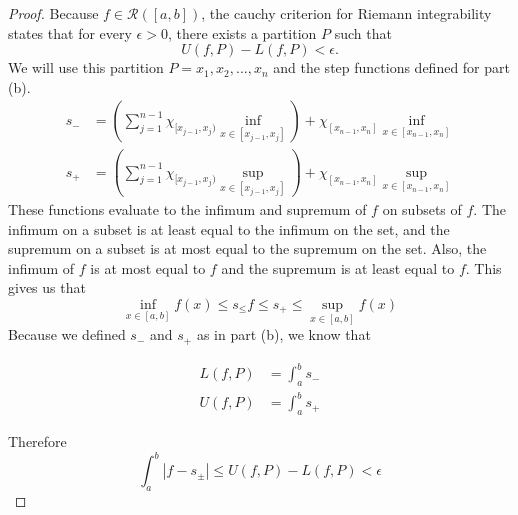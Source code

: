 \documentclass[12pt]{article}
\begin{document}
\begin{itemize}
    \begin{proof}
        Because $f \in \mathcal{R}([a,b])$, the cauchy criterion for Riemann integrability states that for every $\epsilon > 0$, there exists a partition $P$ such that $$U(f,P) - L(f,P) < \epsilon.$$
        We will use this partition $P = x_1, x_2, ..., x_n$ and the step functions defined for part (b).
        \begin{align*}
            s_- &= \left(\sum_{j=1}^{n-1} \chi_{[x_{j-1},x_j)} \inf_{x \in [x_{j-1}, x_j]}\right) + \chi_{[x_{n-1},x_n]} \inf_{x \in [x_{n-1}, x_n]} \\
            s_+ &= \left(\sum_{j=1}^{n-1} \chi_{[x_{j-1},x_j)} \sup_{x \in [x_{j-1}, x_j]}\right) + \chi_{[x_{n-1},x_n]} \sup_{x \in [x_{n-1}, x_n]}
        \end{align*}
        These functions evaluate to the infimum and supremum of $f$ on subsets of $f$. The infimum on a subset is at least equal to the infimum on the set, and the supremum on a subset is at most equal to the supremum on the set. Also, the infimum of $f$ is at most equal to $f$ and the supremum is at least equal to $f$. This gives us that $$\inf_{x \in [a,b]} f(x) \leq s_ \leq f \leq s_+ \leq \sup_{x \in [a,b]} f(x)$$
        Because we defined $s_-$ and $s_+$ as in part (b), we know that

        \begin{align*}
            L(f,P) &= \int_a^b s_- \\
            U(f,P) &= \int_a^b s_+
        \end{align*}

        Therefore $$\int_a^b |f - s_\pm| \leq U(f,P) - L(f,P) < \epsilon$$
    \end{proof}
\end{itemize}
\end{document}
